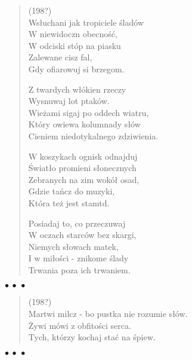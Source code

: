 \documentclass{article} %
\newenvironment{wierszd}[2]
	{\begin{verse} \hspace*{-1em}{\bf #1}\hfill{\small{(#2)}}\\[.5ex] }
	{\end{verse} \begin{center}$\bullet\ \bullet\ \bullet$\end{center}}
\newcommand{\e}{\eob}
\renewcommand{\a}{\aob}
\renewcommand{\o}{\'{o}}
\newcommand{\n}{\'{n}}
\newcommand{\s}{\'{s}}
\renewcommand{\S}{\'{S}}
\newcommand{\ci}{\'{c}}
\begin{document}
\begin{wierszd}{}{198?}

Ws{\l}uchani jak tropiciele {\s}lad{\o}w \\ 
W niewidoczn{\a} obecno{\s}{\ci}, \\ 
W odciski st{\o}p na piasku \\ 
Zalewane cisz{\a} fal, \\ 
Gdy ofiarowuj{\a} si{\e} brzegom. 

Z twardych w{\l}{\o}kien rzeczy \\ 
Wysnuwaj{\a} lot ptak{\o}w. \\ 
Wie\.{z}ami si{\e}gaj{\a} po oddech wiatru, \\ 
Kt{\o}ry owiewa kolumnady s{\l}{\o}w \\ 
Cieniem niedotykalnego zdziwienia. 

W koszykach ognisk odnajduj{\a} \\ 
{\S}wiat{\l}o promieni s{\l}onecznych \\ 
Zebranych na zim{\e} wok{\o}{\l} osad, \\ 
Gdzie ta{\n}cz{\a} do muzyki, \\ 
Kt{\o}ra te\.{z} jest stamt{\a}d. 

Posiadaj{\a} to, co przeczuwaj{\a} \\ 
W oczach starc{\o}w bez skargi, \\ 
Niemych s{\l}owach matek, \\ 
I w mi{\l}o{\s}ci - znikome {\s}lady \\ 
Trwania poza ich trwaniem.
\end{wierszd} \vspace*{-3ex}




\begin{wierszd} {Cisza i {\s}piew I} {198?}
Martwi milcz{\a} - bo pustka nie rozumie s{\l}{\o}w. \\ 
\.{Z}ywi m{\o}wi{\a} z obfito{\s}ci serca. \\ 
Tych, kt{\o}rzy kochaj{\a} sta{\ci} na {\s}piew. \\ 

\end{wierszd}\vspace*{-3ex}
\end{document}
